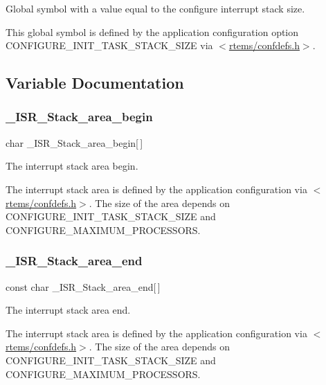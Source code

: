 Global symbol with a value equal to the configure interrupt stack size. 

This global symbol is defined by the application configuration option C\+O\+N\+F\+I\+G\+U\+R\+E\+\_\+\+I\+N\+I\+T\+\_\+\+T\+A\+S\+K\+\_\+\+S\+T\+A\+C\+K\+\_\+\+S\+I\+ZE via $<$\mbox{\hyperlink{confdefs_8h}{rtems/confdefs.\+h}}$>$. 

\subsection{Variable Documentation}
\mbox{\label{group__RTEMSScoreISR_gaa99477ab97d23ea19a5fe92203fc4cd5}} 
\subsubsection{\texorpdfstring{\_ISR\_Stack\_area\_begin}{\_ISR\_Stack\_area\_begin}}
{\footnotesize\ttfamily char \+\_\+\+I\+S\+R\+\_\+\+Stack\+\_\+area\+\_\+begin\mbox{[}$\,$\mbox{]}}



The interrupt stack area begin. 

The interrupt stack area is defined by the application configuration via $<$\mbox{\hyperlink{confdefs_8h}{rtems/confdefs.\+h}}$>$. The size of the area depends on C\+O\+N\+F\+I\+G\+U\+R\+E\+\_\+\+I\+N\+I\+T\+\_\+\+T\+A\+S\+K\+\_\+\+S\+T\+A\+C\+K\+\_\+\+S\+I\+ZE and C\+O\+N\+F\+I\+G\+U\+R\+E\+\_\+\+M\+A\+X\+I\+M\+U\+M\+\_\+\+P\+R\+O\+C\+E\+S\+S\+O\+RS. \mbox{\label{group__RTEMSScoreISR_ga86f97480eba58b44ee331ad49daa54e2}} 
\subsubsection{\texorpdfstring{\_ISR\_Stack\_area\_end}{\_ISR\_Stack\_area\_end}}
{\footnotesize\ttfamily const char \+\_\+\+I\+S\+R\+\_\+\+Stack\+\_\+area\+\_\+end\mbox{[}$\,$\mbox{]}}



The interrupt stack area end. 

The interrupt stack area is defined by the application configuration via $<$\mbox{\hyperlink{confdefs_8h}{rtems/confdefs.\+h}}$>$. The size of the area depends on C\+O\+N\+F\+I\+G\+U\+R\+E\+\_\+\+I\+N\+I\+T\+\_\+\+T\+A\+S\+K\+\_\+\+S\+T\+A\+C\+K\+\_\+\+S\+I\+ZE and C\+O\+N\+F\+I\+G\+U\+R\+E\+\_\+\+M\+A\+X\+I\+M\+U\+M\+\_\+\+P\+R\+O\+C\+E\+S\+S\+O\+RS. 